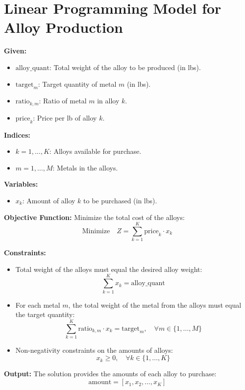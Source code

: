 \documentclass{article}
\begin{document}
\section*{Linear Programming Model for Alloy Production}

\textbf{Given:}
\begin{itemize}
    \item \( \text{alloy\_quant} \): Total weight of the alloy to be produced (in lbs).
    \item \( \text{target}_{m} \): Target quantity of metal \( m \) (in lbs).
    \item \( \text{ratio}_{k,m} \): Ratio of metal \( m \) in alloy \( k \).
    \item \( \text{price}_{k} \): Price per lb of alloy \( k \).
\end{itemize}

\textbf{Indices:}
\begin{itemize}
    \item \( k = 1, \ldots, K \): Alloys available for purchase.
    \item \( m = 1, \ldots, M \): Metals in the alloys.
\end{itemize}

\textbf{Variables:}
\begin{itemize}
    \item \( x_k \): Amount of alloy \( k \) to be purchased (in lbs).
\end{itemize}

\textbf{Objective Function:}
Minimize the total cost of the alloys:
\[
\text{Minimize} \quad Z = \sum_{k=1}^{K} \text{price}_{k} \cdot x_k
\]

\textbf{Constraints:}
\begin{itemize}
    \item Total weight of the alloys must equal the desired alloy weight:
    \[
    \sum_{k=1}^{K} x_k = \text{alloy\_quant}
    \]
    
    \item For each metal \( m \), the total weight of the metal from the alloys must equal the target quantity:
    \[
    \sum_{k=1}^{K} \text{ratio}_{k,m} \cdot x_k = \text{target}_{m}, \quad \forall m \in \{1, \ldots, M\}
    \]
    
    \item Non-negativity constraints on the amounts of alloys:
    \[
    x_k \geq 0, \quad \forall k \in \{1, \ldots, K\}
    \]
\end{itemize}

\textbf{Output:}
The solution provides the amounts of each alloy to purchase:
\[
\text{amount} = [x_{1}, x_{2}, \ldots, x_{K}]
\]
\end{document}
